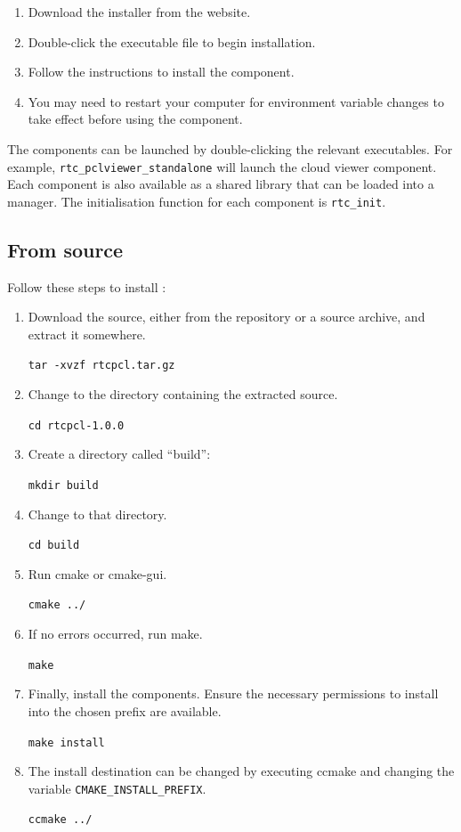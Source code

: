 \documentclass[a4paper,10pt]{article}
\begin{document}
\begin{enumerate}
  \item Download the installer from the website.
  \item Double-click the executable file to begin installation.
  \item Follow the instructions to install the component.
  \item You may need to restart your computer for environment variable changes
  to take effect before using the component.
\end{enumerate}

The components can be launched by double-clicking the relevant executables. For
example, \verb|rtc_pclviewer_standalone| will launch the cloud viewer
component. Each component is also available as a shared library that can be
loaded into a manager. The initialisation function for each component is
\verb|rtc_init|.

\subsection{From source}

Follow these steps to install :

\begin{enumerate}
  \item Download the source, either from the repository or a source archive,
  and extract it somewhere.

  \verb|tar -xvzf rtcpcl.tar.gz|
  \item Change to the directory containing the extracted source.

  \verb|cd rtcpcl-1.0.0|
  \item Create a directory called ``build'':

  \verb|mkdir build|
  \item Change to that directory.

  \verb|cd build|
  \item Run cmake or cmake-gui.

  \verb|cmake ../|
  \item If no errors occurred, run make.

  \verb|make|
  \item Finally, install the components. Ensure the necessary permissions to
  install into the chosen prefix are available.

  \verb|make install|
  \item The install destination can be changed by executing ccmake and changing
  the variable \verb|CMAKE_INSTALL_PREFIX|.

  \verb|ccmake ../|
\end{enumerate}
\end{document}
